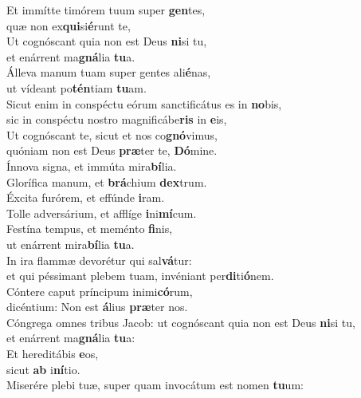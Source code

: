 \evenverse Et immítte timórem tuum super \textbf{gen}tes,~\*\\
\evenverse quæ non ex\textbf{qui}si\textbf{é}runt te,\\
\oddverse Ut cognóscant quia non est Deus \textbf{ni}si tu,~\*\\
\oddverse et enárrent ma\textbf{gná}lia \textbf{tu}a.\\
\evenverse Álleva manum tuam super gentes ali\textbf{é}nas,~\*\\
\evenverse ut vídeant po\textbf{tén}tiam \textbf{tu}am.\\
\oddverse Sicut enim in conspéctu eórum sanctificátus es in \textbf{no}bis,~\*\\
\oddverse sic in conspéctu nostro magnificábe\textbf{ris} in \textbf{e}is,\\
\evenverse Ut cognóscant te, sicut et nos co\textbf{gnó}vimus,~\*\\
\evenverse quóniam non est Deus \textbf{præ}ter te, \textbf{Dó}mine.\\
\oddverse Ínnova signa, et immúta mira\textbf{bí}lia.~\*\\
\oddverse Glorífica manum, et \textbf{brá}chium \textbf{dex}trum.\\
\evenverse Éxcita furórem, et effúnde \textbf{i}ram.~\*\\
\evenverse Tolle adversárium, et afflíge \textbf{i}ni\textbf{mí}cum.\\
\oddverse Festína tempus, et meménto \textbf{fi}nis,~\*\\
\oddverse ut enárrent mira\textbf{bí}lia \textbf{tu}a.\\
\evenverse In ira flammæ devorétur qui sal\textbf{vá}tur:~\*\\
\evenverse et qui péssimant plebem tuam, invéniant per\textbf{di}ti\textbf{ó}nem.\\
\oddverse Cóntere caput príncipum inimi\textbf{có}rum,~\*\\
\oddverse dicéntium: Non est \textbf{á}lius \textbf{præ}ter nos.\\
\evenverse Cóngrega omnes tribus Jacob: ut cognóscant quia non est Deus \textbf{ni}si tu,~\*\\
\evenverse et enárrent ma\textbf{gná}lia \textbf{tu}a:\\
\oddverse Et hereditábis \textbf{e}os,~\*\\
\oddverse sicut \textbf{ab} i\textbf{ní}tio.\\
\evenverse Miserére plebi tuæ, super quam invocátum est nomen \textbf{tu}um:~\*\\
